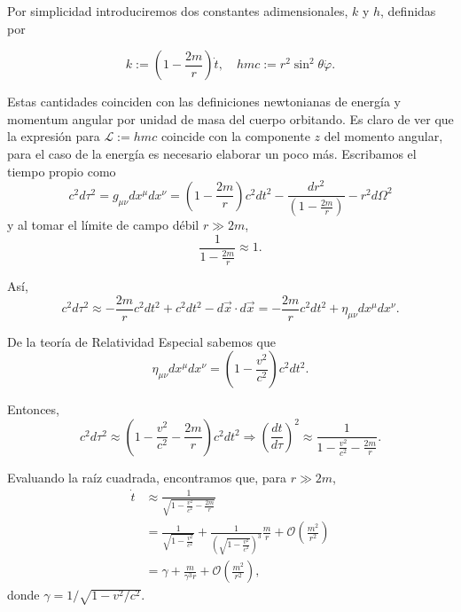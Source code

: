 \documentclass[letterpaper,11pt]{article}
\begin{document}
Por simplicidad introduciremos dos constantes adimensionales, $k$ y $h$, definidas por 
\begin{shaded}
\begin{equation} \label{eq:Cantidades-Conservadas}
k:= \left( 1 - \frac{2m}{r}\right) \dot{t}, \quad hmc := r^2 \sin^2\theta \dot{\varphi}.
\end{equation}
\end{shaded}

Estas cantidades coinciden con las definiciones newtonianas de energía y momentum angular por unidad de masa del cuerpo orbitando. Es claro de ver que la expresión para $\mathcal{L} := hmc$ coincide con la componente $z$ del momento angular, para el caso de la energía es necesario elaborar un poco más. Escribamos el tiempo propio como
\begin{equation}
c^2d\tau^2 = g_{\mu\nu} dx^{\mu}dx^{\nu} = \left(1 - \frac{2m}{r} \right) c^2 dt^2 - \frac{dr^2}{\left( 1 - \frac{2m}{r}\right)} - r^2 d\Omega^2 
\end{equation}
y al tomar el límite de campo débil $r \gg 2m$, 
\begin{equation}
\frac{1}{1 - \frac{2m}{r}} \approx 1.
\end{equation}

Así,
\begin{equation}
 c^2d\tau^2 \approx - \frac{2m}{r} c^2 dt^2 + c^2 dt^2 - d\vec{x} \cdot d\vec{x} = - \frac{2m}{r} c^2 dt^2 + \eta_{\mu\nu} dx^{\mu}dx^{\nu}.
\end{equation}

De la teoría de Relatividad Especial sabemos que 
\begin{equation}
\eta_{\mu\nu} dx^{\mu}dx^{\nu} = \left( 1 - \frac{v^2}{c^2}\right) c^2 dt^2.
\end{equation}

Entonces, 
\begin{equation}
c^2d\tau^2 \approx \left(1 - \frac{v^2}{c^2} - \frac{2m}{r} \right) c^2 dt^2 \Rightarrow \left(\frac{dt}{d\tau} \right)^2 \approx \frac{1}{1 - \frac{v^2}{c^2} - \frac{2m}{r}}.
\end{equation}

Evaluando la raíz cuadrada, encontramos que, para $r\gg 2m$,
\begin{align}
\dot{t} &\approx \frac{1}{\sqrt{1 - \frac{v^2}{c^2} - \frac{2m}{r}}} \nonumber \\
&= \frac{1}{\sqrt{1 -\frac{v^2}{c^2}}}  + \frac{1}{\left(\sqrt{1 -\frac{v^2}{c^2}  }\right)^3} \frac{m}{r} + \mathcal{O}\left(\frac{m^2}{r^2} \right) \nonumber\\
&= \gamma + \frac{m}{\gamma^3 r} + \mathcal{O}\left(\frac{m^2}{r^2} \right),
\end{align}
donde $\gamma = 1/\sqrt{1 - v^2/c^2}$. 
\end{document}
